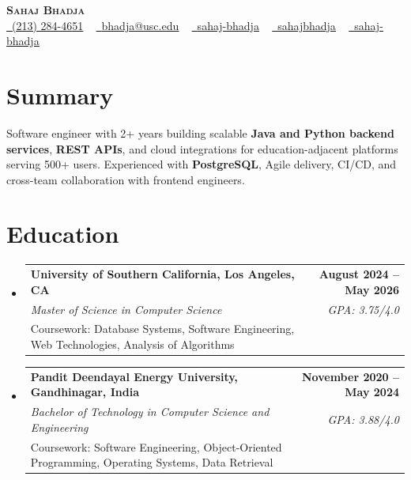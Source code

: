 \documentclass[letterpaper,10pt]{article}
\makeatletter
\newcommand{\resumeEduSubheading}[5]{\vspace{-1pt}\item\begin{tabular*}{1.0\textwidth}[t]{l@{\extracolsep{\fill}}r}\textbf{#1} & \textbf{\small #2} \\\textit{\small #3} & \textit{\small #4} \\\small #5 & \\\end{tabular*}\vspace{-4pt}}
\newcommand{\resumeSubHeadingListStart}{\begin{itemize}[leftmargin=0.0in, label={}]}
\newcommand{\resumeSubHeadingListEnd}{\end{itemize}}
\makeatother
\begin{document}
\begin{center}
{\Huge \scshape \textbf{Sahaj Bhadja}} \\ \vspace{1pt}
\small \href{tel:(213) 284-4651}{\faPhone\ \underline{(213) 284-4651}} ~ \href{mailto:bhadja@usc.edu}{\raisebox{-0.2\height}\faEnvelope\ \underline{bhadja@usc.edu}} ~
\href{https://www.linkedin.com/in/sahaj-bhadja/}{\raisebox{-0.2\height}\faLinkedin\ \underline{sahaj-bhadja}} ~ \href{https://github.com/SAHAJ-BHADJA}{\raisebox{-0.2\height}\faGithub\ \underline{sahajbhadja}} ~
\href{https://sahaj-bhadja.vercel.app/}{\raisebox{-0.2\height}\faGlobe\ \underline{sahaj-bhadja}}
\end{center}
\vspace{-18pt}
\section{Summary}
\begin{itemize}[leftmargin=0.15in, label={}]
\small{\item{Software engineer with 2+ years building scalable \textbf{Java and Python backend services}, \textbf{REST APIs}, and cloud integrations for education-adjacent platforms serving 500+ users. Experienced with \textbf{PostgreSQL}, Agile delivery, CI/CD, and cross-team collaboration with frontend engineers.}}
\end{itemize}
\vspace{-16pt}
\section{Education}
\resumeSubHeadingListStart
\resumeEduSubheading{University of Southern California, Los Angeles, CA}{August 2024 -- May 2026}{Master of Science in Computer Science}{GPA: 3.75/4.0}{Coursework: Database Systems, Software Engineering, Web Technologies, Analysis of Algorithms}
\vspace{-9pt}
\resumeEduSubheading{Pandit Deendayal Energy University, Gandhinagar, India}{November 2020 -- May 2024}{Bachelor of Technology in Computer Science and Engineering}{GPA: 3.88/4.0}{Coursework: Software Engineering, Object-Oriented Programming, Operating Systems, Data Retrieval}
\resumeSubHeadingListEnd
\vspace{-14pt}
\end{document}
